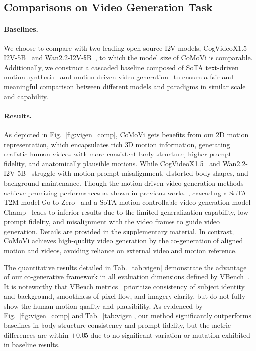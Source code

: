 \subsection{Comparisons on Video Generation Task}
\label{sec:comp_vigen}

\paragraph{\bf Baselines.}
We choose to compare with two leading open-source I2V models, CogVideoX1.5-I2V-5B~\cite{yang2024cogvideox} and Wan2.2-I2V-5B~\cite{wan2025wan}, to which the model size of CoMoVi is comparable. Additionally, we construct a cascaded baseline composed of SoTA text-driven motion synthesis~\cite{fan2025gotozero} and motion-driven video generation~\cite{zhu2024champ} to ensure a fair and meaningful comparison between different models and paradigms in similar scale and capability.

\vspace{-2mm}
\paragraph{\bf Results.} As depicted in Fig.~\ref{fig:vigen_comp}, CoMoVi gets benefits from our 2D motion representation, which encapsulates rich 3D motion information, generating realistic human videos with more consistent body structure, higher prompt fidelity, and anatomically plausible motions. While CogVideoX1.5~\cite{yang2024cogvideox} and Wan2.2-I2V-5B~\cite{wan2025wan} struggle with motion-prompt misalignment, distorted body shapes, and background maintenance. 
Though the motion-driven video generation methods achieve promising performances as shown in previous works~\cite{hu2024animate,zhu2024champ,wang2024humanvid}, cascading a SoTA T2M model Go-to-Zero~\cite{fan2025gotozero} and a SoTA motion-controllable video generation model Champ~\cite{zhu2024champ} leads to inferior results due to the limited generalization capability, low prompt fidelity, and misalignment with the video frames to guide video generation. Details are provided in the supplementary material. In contrast, CoMoVi achieves high-quality video generation by the co-generation of aligned motion and videos, avoiding reliance on external video and motion reference. 

The quantitative results detailed in Tab.~\ref{tab:vigen} demonstrate the advantage of our co-generative framework in all evaluation dimensions defined by VBench~\cite{huang2023vbench,huang2024vbench++,zheng2025vbench2}. 
It is noteworthy that VBench metrics~\cite{huang2023vbench,zheng2025vbench2,huang2024vbench++} prioritize consistency of subject identity and background, smoothness of pixel flow, and imagery clarity, but do not fully show the human motion quality and plausibility. As evidenced by Fig.~\ref{fig:vigen_comp} and Tab.~\ref{tab:vigen}, our method significantly outperforms baselines in body structure consistency and prompt fidelity, but the metric differences are within $\pm 0.05$ due to no significant variation or mutation exhibited in baseline results.

